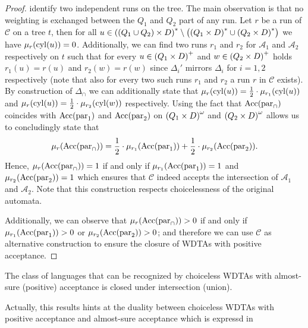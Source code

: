 \begin{proof}
  identify two independent runs on the tree. The main observation is that no
  weighting is exchanged between the $Q_{1}$ and $Q_{2}$ part of any run. Let
  $r$ be a run of $\mathcal{C}$ on a tree $t$, then for all $u\in \left(
    \left(Q_{1}\cup Q_{2}\right)\times D\right)^{*}\setminus\left(
    \left(Q_{1}\times D\right)^{*}\cup\left(Q_{2}\times D\right)^{*}\right)$ we have 
  $\mu_{r}(\operatorname{cyl}(u)) = 0$. Additionally, we can find two runs $r_{1}$ and 
  $r_{2}$ for $\mathcal{A}_{1}$ and $\mathcal{A}_{2}$ respectively on $t$ such
  that for every $u\in\left(Q_{1}\times D\right)^{+}$ and 
  $w\in\left(Q_{2}\times D\right)^{+}$ holds $r_{1}(u)=r(u)$ and $r_{2}(w)=r(w)$ 
  since $\Delta_{i}'$ mirrors $\Delta_{i}$ for $i= 1,2$ respectively (note that
  also for every two such runs $r_{1}$ and $r_{2}$ a run $r$ in $\mathcal{C}$
  exists). By construction of $\Delta_{\cap}$ we can additionally state that 
  $\mu_{r}(\operatorname{cyl}(u)) = \frac{1}{2}\cdot\mu_{r_{1}}(\operatorname{cyl}(u))$ and 
  $\mu_{r}(\operatorname{cyl}(u)) = \frac{1}{2}\cdot\mu_{r_{2}}(\operatorname{cyl}(w))$ respectively. Using
  the fact that $\operatorname{Acc}(\operatorname{par}_{\cap})$ coincides with $\operatorname{Acc}(\operatorname{par}_{1})$ and
  $\operatorname{Acc}(\operatorname{par}_{2})$ on $\left(Q_{1}\times D\right)^{\omega}$ and 
  $\left(Q_{2}\times D\right)^{\omega}$ allows us to concludingly state that
  \begin{equation*}
    \mu_{r}(\operatorname{Acc}(\operatorname{par}_{\cap})) = 
      \frac{1}{2}\cdot\mu_{r_{1}}(\operatorname{Acc}(\operatorname{par}_{1})) 
    + \frac{1}{2}\cdot\mu_{r_{2}}(\operatorname{Acc}(\operatorname{par}_{2})).
  \end{equation*}
  Hence, $\mu_{r}(\operatorname{Acc}(\operatorname{par}_{\cap})) = 1$ if and only if 
  $\mu_{r_{1}}(\operatorname{Acc}(\operatorname{par}_{1})) = 1$ and 
  $\mu_{r_{2}}(\operatorname{Acc}(\operatorname{par}_{2})) = 1$ which ensures that $\mathcal{C}$ indeed
  accepts the intersection of $\mathcal{A}_{1}$ and $\mathcal{A}_{2}$. Note 
  that this construction respects choicelessness of the original automata.

  Additionally, we can observe that $\mu_{r}(\operatorname{Acc}(\operatorname{par}_{\cap})) > 0$ if and 
  only if $\mu_{r_{1}}(\operatorname{Acc}(\operatorname{par}_{1}))>0$ or 
  $\mu_{r_{2}}(\operatorname{Acc}(\operatorname{par}_{2}))>0$; and therefore we can use $\mathcal{C}$ as
  alternative construction to ensure the closure of \acp{WDTA} with positive
  acceptance.
\end{proof}
\begin{corollary}
  The class of languages that can be recognized by choiceless \acp{WDTA} with
  almost-sure (positive) acceptance is closed under intersection (union).  
\end{corollary}
Actually, this results hints at the duality between choiceless \acp{WDTA} with 
positive acceptance and almost-sure acceptance which is expressd in

